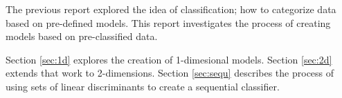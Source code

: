 The previous report explored the idea of classification; how to categorize data
based on pre-defined models. This report investigates the process of creating
models based on pre-classified data.

Section \ref{sec:1d} explores the creation of 1-dimesional models. Section
\ref{sec:2d} extends that work to 2-dimensions. Section \ref{sec:sequ}
describes the process of using sets of linear discriminants to create a
sequential classifier.